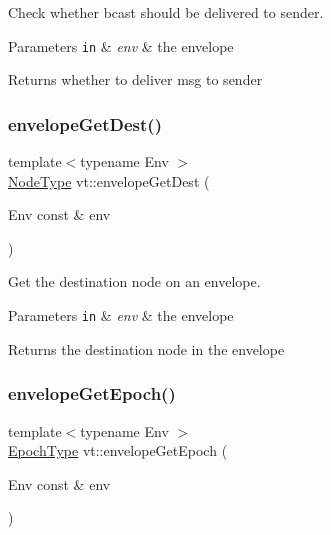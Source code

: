 Check whether bcast should be delivered to sender. 


\begin{DoxyParams}[1]{Parameters}
\mbox{\tt in}  & {\em env} & the envelope\\
\hline
\end{DoxyParams}
\begin{DoxyReturn}{Returns}
whether to deliver msg to sender 
\end{DoxyReturn}
\mbox{\label{namespacevt_a99cdbbb47f13203e14b01fa43bca99e9}} 
\subsubsection{\texorpdfstring{envelope\+Get\+Dest()}{envelopeGetDest()}}
{\footnotesize\ttfamily template$<$typename Env $>$ \\
\hyperlink{namespacevt_a866da9d0efc19c0a1ce79e9e492f47e2}{Node\+Type} vt\+::envelope\+Get\+Dest (\begin{DoxyParamCaption}\item[{Env const \&}]{env }\end{DoxyParamCaption})\hspace{0.3cm}{\ttfamily [inline]}}



Get the destination node on an envelope. 


\begin{DoxyParams}[1]{Parameters}
\mbox{\tt in}  & {\em env} & the envelope\\
\hline
\end{DoxyParams}
\begin{DoxyReturn}{Returns}
the destination node in the envelope 
\end{DoxyReturn}
\mbox{\label{namespacevt_ad5495e7900227550b44837e899c5bb13}} 
\subsubsection{\texorpdfstring{envelope\+Get\+Epoch()}{envelopeGetEpoch()}}
{\footnotesize\ttfamily template$<$typename Env $>$ \\
\hyperlink{namespacevt_a81d11b28122d43bf9834577e4a06440f}{Epoch\+Type} vt\+::envelope\+Get\+Epoch (\begin{DoxyParamCaption}\item[{Env const \&}]{env }\end{DoxyParamCaption})\hspace{0.3cm}{\ttfamily [inline]}}



